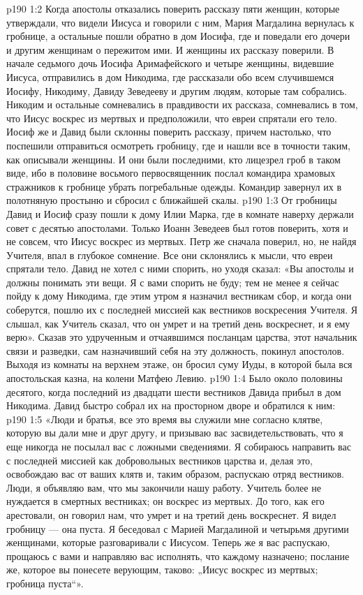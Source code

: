 \vs p190 1:2 Когда апостолы отказались поверить рассказу пяти женщин, которые утверждали, что видели Иисуса и говорили с ним, Мария Магдалина вернулась к гробнице, а остальные пошли обратно в дом Иосифа, где и поведали его дочери и другим женщинам о пережитом ими. И женщины их рассказу поверили. В начале седьмого дочь Иосифа Аримафейского и четыре женщины, видевшие Иисуса, отправились в дом Никодима, где рассказали обо всем случившемся Иосифу, Никодиму, Давиду Зеведееву и другим людям, которые там собрались. Никодим и остальные сомневались в правдивости их рассказа, сомневались в том, что Иисус воскрес из мертвых и предположили, что евреи спрятали его тело. Иосиф же и Давид были склонны поверить рассказу, причем настолько, что поспешили отправиться осмотреть гробницу, где и нашли все в точности таким, как описывали женщины. И они были последними, кто лицезрел гроб в таком виде, ибо в половине восьмого первосвященник послал командира храмовых стражников к гробнице убрать погребальные одежды. Командир завернул их в полотняную простыню и сбросил с ближайшей скалы.
\vs p190 1:3 От гробницы Давид и Иосиф сразу пошли к дому Илии Марка, где в комнате наверху держали совет с десятью апостолами. Только Иоанн Зеведеев был готов поверить, хотя и не совсем, что Иисус воскрес из мертвых. Петр же сначала поверил, но, не найдя Учителя, впал в глубокое сомнение. Все они склонялись к мысли, что евреи спрятали тело. Давид не хотел с ними спорить, но уходя сказал: «Вы апостолы и должны понимать эти вещи. Я с вами спорить не буду; тем не менее я сейчас пойду к дому Никодима, где этим утром я назначил вестникам сбор, и когда они соберутся, пошлю их с последней миссией как вестников воскресения Учителя. Я слышал, как Учитель сказал, что он умрет и на третий день воскреснет, и я ему верю». Сказав это удрученным и отчаявшимся посланцам царства, этот начальник связи и разведки, сам назначивший себя на эту должность, покинул апостолов. Выходя из комнаты на верхнем этаже, он бросил суму Иуды, в которой была вся апостольская казна, на колени Матфею Левию.
\vs p190 1:4 Было около половины десятого, когда последний из двадцати шести вестников Давида прибыл в дом Никодима. Давид быстро собрал их на просторном дворе и обратился к ним:
\vs p190 1:5 \pc «Люди и братья, все это время вы служили мне согласно клятве, которую вы дали мне и друг другу, и призываю вас засвидетельствовать, что я еще никогда не посылал вас с ложными сведениями. Я собираюсь направить вас с последней миссией как добровольных вестников царства и, делая это, освобождаю вас от ваших клятв и, таким образом, распускаю отряд вестников. Люди, я объявляю вам, что мы закончили нашу работу. Учитель более не нуждается в смертных вестниках; он воскрес из мертвых. До того, как его арестовали, он говорил нам, что умрет и на третий день воскреснет. Я видел гробницу --- она пуста. Я беседовал с Марией Магдалиной и четырьмя другими женщинами, которые разговаривали с Иисусом. Теперь же я вас распускаю, прощаюсь с вами и направляю вас исполнять, что каждому назначено; послание же, которое вы понесете верующим, таково: „Иисус воскрес из мертвых; гробница пуста“».
